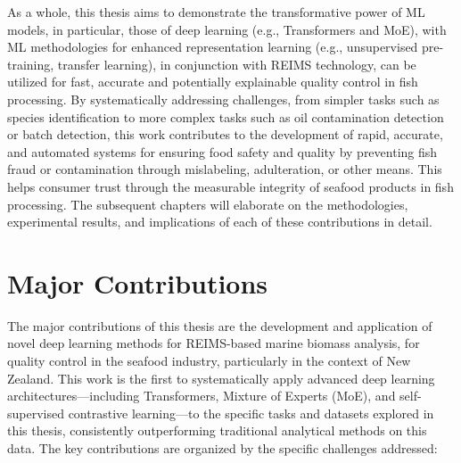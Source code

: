 As a whole, this thesis aims to demonstrate the transformative power of ML models, in particular, those of deep learning (e.g., Transformers and MoE), with ML methodologies for enhanced representation learning (e.g., unsupervised pre-training, transfer learning), in conjunction with REIMS technology, can be utilized for fast, accurate and potentially explainable quality control in fish processing. By systematically addressing challenges, from simpler tasks such as species identification to more complex tasks such as oil contamination detection or batch detection, this work contributes to the development of rapid, accurate, and automated systems for ensuring food safety and quality by preventing fish fraud or contamination through mislabeling, adulteration, or other means. This helps consumer trust through the measurable integrity of seafood products in fish processing. The subsequent chapters will elaborate on the methodologies, experimental results, and implications of each of these contributions in detail.

\section{Major Contributions}

The major contributions of this thesis are the development and application of novel deep learning methods for REIMS-based marine biomass analysis, for quality control in the seafood industry, particularly in the context of New Zealand. This work is the first to systematically apply advanced deep learning architectures—including Transformers, Mixture of Experts (MoE), and self-supervised contrastive learning—to the specific tasks and datasets explored in this thesis, consistently outperforming traditional analytical methods on this data. The key contributions are organized by the specific challenges addressed:

